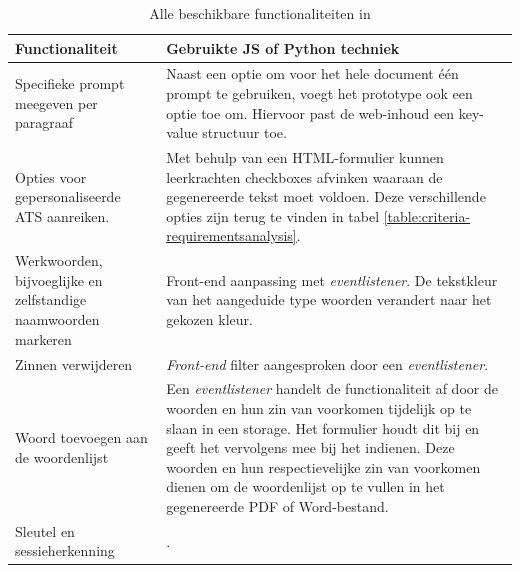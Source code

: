 \begin{center}
	\begin{table}[H]
		\begin{tabular}{ | m{7cm} | m{8cm} | } 
			\hline
			\textbf{Functionaliteit} & Gebruikte JS of Python techniek \\
			\hline
			Specifieke prompt meegeven per paragraaf & Naast een optie om voor het hele document één prompt te gebruiken, voegt het prototype ook een optie toe om. Hiervoor past de web-inhoud een key-value structuur toe. \\
			\hline
			Opties voor gepersonaliseerde ATS aanreiken. & Met behulp van een HTML-formulier kunnen leerkrachten checkboxes afvinken waaraan de gegenereerde tekst moet voldoen. Deze verschillende opties zijn terug te vinden in tabel \ref{table:criteria-requirementsanalysis}. \\
			\hline
			Werkwoorden, bijvoeglijke en zelfstandige naamwoorden markeren & Front-end aanpassing met \textit{eventlistener}. De tekstkleur van het aangeduide type woorden verandert naar het gekozen kleur. \\
			\hline
			Zinnen verwijderen & \textit{Front-end} filter aangesproken door een \textit{eventlistener}. \\
			\hline
			Woord toevoegen aan de woordenlijst & Een \textit{eventlistener} handelt de functionaliteit af door de woorden en hun zin van voorkomen tijdelijk op te slaan in een storage. Het formulier houdt dit bij en geeft het vervolgens mee bij het indienen. Deze woorden en hun respectievelijke zin van voorkomen dienen om de woordenlijst op te vullen in het gegenereerde PDF of Word-bestand. \\ 
			\hline
			Sleutel en sessieherkenning & . \\
			\hline 
		\end{tabular}
	\caption{Alle beschikbare functionaliteiten in }
	\label{table:functionaliteiten-leerkrachten}
	\end{table}
\end{center}

